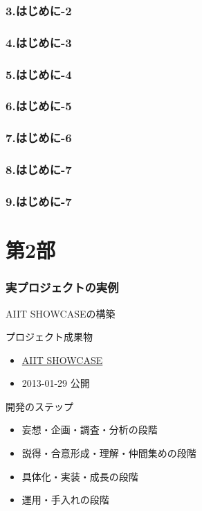 \documentclass{beamer}
\begin{document}
\section{3.はじめに-2}
\section{4.はじめに-3}
\section{5.はじめに-4}
\section{6.はじめに-5}
\section{7.はじめに-6}
\section{8.はじめに-7}
\section{9.はじめに-7}

\part{第2部}

\section{実プロジェクトの実例}
\label{sec-3}
\begin{frame}[label=sec-3-1]{AIIT SHOWCASEの構築}
\begin{block}{プロジェクト成果物}
\begin{itemize}
\item \href{http://showcase.aiit.ac.jp/}{AIIT SHOWCASE}
\item 2013-01-29 公開
\end{itemize}
\end{block}

\begin{block}{開発のステップ}
\begin{itemize}
\item 妄想・企画・調査・分析の段階
\item 説得・合意形成・理解・仲間集めの段階
\item 具体化・実装・成長の段階
\item 運用・手入れの段階
\end{itemize}
\end{block}
\end{frame}
\end{document}

